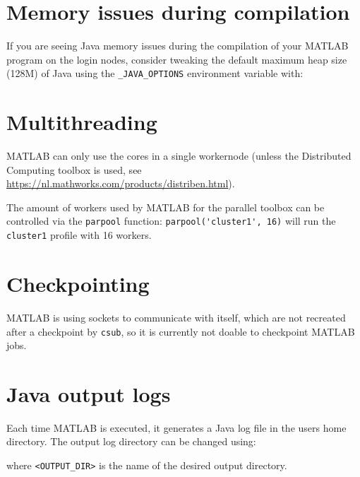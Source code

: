 
\section{Memory issues during compilation}

If you are seeing Java memory issues during the compilation of your MATLAB program
on the login nodes, consider tweaking the default maximum heap size (128M) of Java
using the \verb|_JAVA_OPTIONS| environment variable with:

\begin{prompt}
\end{prompt}

\section{Multithreading}

MATLAB can only use the cores in a single
workernode (unless the Distributed Computing toolbox is used, see
\url{https://nl.mathworks.com/products/distriben.html}).

The amount of workers used by MATLAB for the parallel toolbox can be controlled
via the \verb|parpool| function: \verb|parpool('cluster1', 16)| will run the
\verb|cluster1| profile with 16 workers.

\section{Checkpointing}

MATLAB is using sockets to communicate with itself, which are not recreated after a
checkpoint by \verb|csub|, so it is currently not doable to checkpoint MATLAB jobs.

\section{Java output logs}

Each time MATLAB is executed, it generates a Java log file in the users home directory.
The output log directory can be changed using:

\begin{prompt}
\end{prompt}

where \verb|<OUTPUT_DIR>| is the name of the desired output directory.

